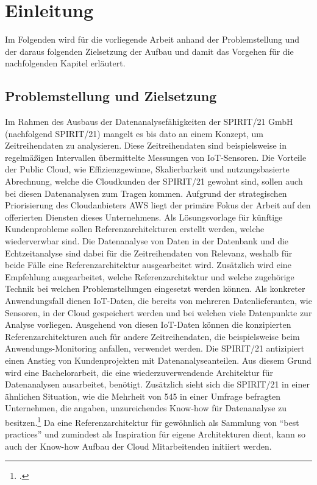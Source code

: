 \chapter{Einleitung}\label{chapter:Einleitun}
Im Folgenden wird für die vorliegende Arbeit anhand der Problemstellung und der daraus folgenden Zielsetzung der Aufbau und damit das Vorgehen für die nachfolgenden Kapitel erläutert.
\section{Problemstellung und Zielsetzung}\label{section:Problemstellung-und-Zielsetzun}
Im Rahmen des Ausbaus der Datenanalysefähigkeiten der SPIRIT/21 GmbH (nachfolgend SPIRIT/21) mangelt es bis dato an einem Konzept, um Zeitreihendaten zu analysieren. 
Diese Zeitreihendaten sind beispielsweise in regelmäßigen Intervallen übermittelte Messungen von \acf{IoT}-Sensoren. Die Vorteile der Public Cloud, wie Effizienzgewinne, Skalierbarkeit und nutzungsbasierte Abrechnung, welche die Cloudkunden der SPIRIT/21 gewohnt sind, sollen auch bei diesen Datenanalysen zum Tragen kommen. 
Aufgrund der strategischen Priorisierung des Cloudanbieters \acf{AWS} liegt der primäre Fokus der Arbeit auf den offerierten Diensten dieses Unternehmens.
Als Lösungsvorlage für künftige Kundenprobleme sollen Referenzarchitekturen erstellt werden, welche wiederverwbar sind. 
Die Datenanalyse von Daten in der Datenbank und die Echtzeitanalyse sind dabei für die
Zeitreihendaten von Relevanz, weshalb für beide Fälle eine Referenzarchitektur ausgearbeitet wird.
Zusätzlich wird eine Empfehlung ausgearbeitet, welche Referenzarchitektur und welche
zugehörige Technik bei welchen Problemstellungen eingesetzt werden können. Als konkreter Anwendungsfall dienen \ac{IoT}-Daten, die bereits von mehreren Datenlieferanten, wie Sensoren, in der Cloud gespeichert werden und bei welchen viele Datenpunkte zur Analyse vorliegen. Ausgehend von diesen \ac{IoT}-Daten können die konzipierten Referenzarchitekturen auch für andere Zeitreihendaten, die beispielsweise beim Anwendungs-Monitoring anfallen, verwendet werden. 
Die SPIRIT/21 antizipiert einen Anstieg von Kundenprojekten mit Datenanalyseanteilen. Aus diesem Grund wird eine Bachelorarbeit, die eine wiederzuverwendende Architektur für Datenanalysen ausarbeitet, benötigt. Zusätzlich sieht sich die SPIRIT/21 in einer ähnlichen Situation, wie die Mehrheit von 545 in einer Umfrage befragten Unternehmen, die angaben, unzureichendes Know-how für Datenanalyse zu besitzen.\footcite[Vgl.][]{o.V..o.J.} Da eine Referenzarchitektur für gewöhnlich als Sammlung von \enquote{best practices} und zumindest als Inspiration für eigene Architekturen dient, kann so auch der Know-how Aufbau der Cloud Mitarbeitenden initiiert werden.

